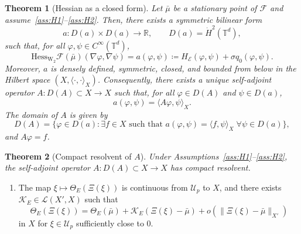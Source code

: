 \documentclass[10pt,a4paper]{amsart}
\newtheorem{theorem}{Theorem}
\newcommand{\E}{\mathcal{E}}
\newcommand{\F}{\mathcal{F}}
\newcommand{\R}{\mathbb{R}}
\newcommand{\T}{\mathbb{T}}
\newcommand{\Wtwo}{\operatorname{W}_2}
\newcommand{\dotHk}[1][k]{\dot{H}^{#1}}
\begin{document}
\begin{theorem}[Hessian as a closed form]
    \label{thm:hessian_form}
    Let $\bar\mu$ be a stationary point of $\F$ and assume~\ref{ass:H1}--\ref{ass:H2}. 
    Then, there exists a symmetric bilinear form
    \[
    a: D(a) \times D(a) \to \R, \qquad D(a) = \dotHk[2](\T^d),
    \]
    such that, for all $\varphi, \psi \in C^\infty(\T^d)$,
    \begin{equation}
        \label{eq:HessianF_formula}
        \mathrm{Hess}_{\Wtwo} \F(\bar\mu)(\nabla \varphi, \nabla \psi) = a(\varphi,\psi) \coloneqq H_\E(\varphi,\psi) + \sigma q_0(\varphi, \psi).
    \end{equation}
    Moreover, $a$ is densely defined, symmetric, closed, and bounded from below in the Hilbert space $(X, \langle\cdot,\cdot\rangle_X)$.
    Consequently, there exists a unique self-adjoint operator $A : D(A)\subset X \to X$ such that, for all $\varphi \in D(A)$ and $\psi \in D(a)$,
    \begin{equation}
        \label{eq:A_representation}
        a(\varphi, \psi) = \langle A\varphi, \psi\rangle_X.
    \end{equation}
    The domain of $A$ is given by
    \[
    D(A) = \big\{\varphi \in D(a) : \exists f \in X \text{ such that } a(\varphi,\psi) = \langle f,\psi\rangle_X \; \forall \psi \in D(a)\big\},
    \]
    and $A\varphi = f$.
\end{theorem}

\begin{theorem}[Compact resolvent of $A$]
    \label{thm:compact_resolvent_a}
    Under Assumptions~\ref{ass:H1}--\ref{ass:H2}, the self-adjoint operator $A : D(A) \subset X \to X$ has compact resolvent.
\end{theorem}

\begin{enumerate}[label=(H\arabic*),ref=(H\arabic*),start=3]
    \item\label{ass:H3} The map $\xi \mapsto \Theta_E(\Xi(\xi))$ is continuous from $\mathcal{U}_p$ to $X$, and there exists $\mathcal{K}_E \in \mathcal{L}(X', X)$ such that
    \[
    \Theta_E(\Xi(\xi)) = \Theta_E(\bar\mu) + \mathcal{K}_E(\Xi(\xi)-\bar\mu) + o(\|\Xi(\xi)-\bar\mu\|_{X'})
    \]
    in $X$ for $\xi \in \mathcal{U}_p$ sufficiently close to $0$.
\end{enumerate}
\end{document}
